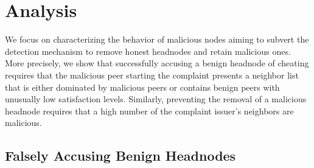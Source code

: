 \section{Analysis}
\label{sec:analysis}



We focus on characterizing the behavior of malicious nodes aiming to subvert the detection mechanism to remove honest headnodes and retain malicious ones. 
More precisely, we show that successfully accusing a benign headnode of cheating requires that the malicious peer starting the complaint presents a neighbor list that is either dominated by malicious peers or contains benign peers with unusually low satisfaction levels. Similarly, preventing the removal of a malicious headnode requires that a high number of the complaint issuer's neighbors are malicious. 


\subsection{Falsely Accusing Benign Headnodes}

